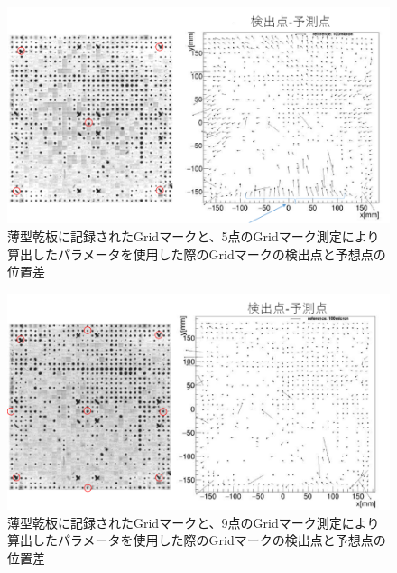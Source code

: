 \documentclass[12pt,a4paper]{jarticle}
\begin{document}
\begin{figure}[htbp]
  \centering
     \includegraphics[width=150mm]{grid5_pl01scan.png}
  \caption{薄型乾板に記録されたGridマークと、5点のGridマーク測定により算出したパラメータを使用した際のGridマークの検出点と予想点の位置差\label{fig:grid5}}
\end{figure}
\begin{figure}[htbp]
  \centering
     \includegraphics[width=150mm]{grid9_pl01scan.png}
  \caption{薄型乾板に記録されたGridマークと、9点のGridマーク測定により算出したパラメータを使用した際のGridマークの検出点と予想点の位置差\label{fig:grid9}}
\end{figure}
\end{document}
